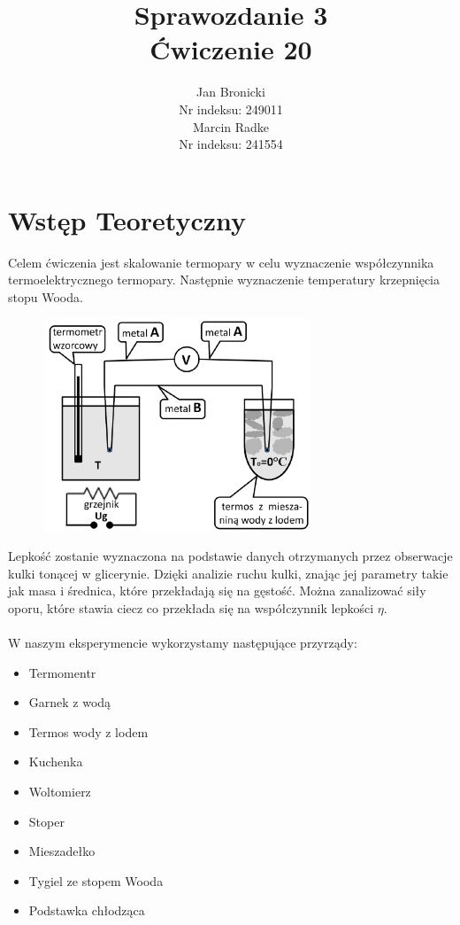 \documentclass{article}
\title{Sprawozdanie 3\\ Ćwiczenie 20}
\author{Jan Bronicki \\
Nr indeksu: 249011\\
Marcin Radke\\
Nr indeksu: 241554}
\date{}
\begin{document}
\maketitle
\section{Wstęp Teoretyczny}
Celem ćwiczenia jest skalowanie termopary w celu wyznaczenie współczynnika termoelektrycznego termopary. Następnie wyznaczenie temperatury krzepnięcia stopu Wooda.\\
\begin{figure}[h]
    \includegraphics[width=8cm]{schemat_ukladu.png}
\end{figure}
Lepkość zostanie wyznaczona na podstawie danych otrzymanych przez obserwacje kulki 
tonącej w glicerynie. Dzięki analizie ruchu kulki, znając jej parametry takie 
jak masa i średnica, które przekładają się na gęstość. Można zanalizować siły oporu,
które stawia ciecz co przekłada się na współczynnik lepkości $\eta$.\\ \\
W naszym eksperymencie wykorzystamy następujące przyrządy:\\
\begin{itemize}
    \item Termomentr
    \item Garnek z wodą
    \item Termos wody z lodem
    \item Kuchenka
    \item Woltomierz
    \item Stoper
    \item Mieszadełko
    \item Tygiel ze stopem Wooda
    \item Podstawka chłodząca
\end{itemize}
\end{document}
